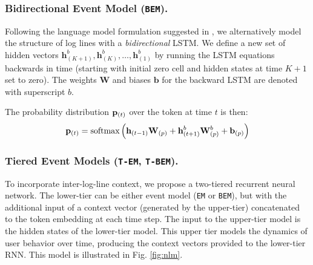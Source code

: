 \documentclass[letterpaper]{article} %
\begin{document}
\subsubsection{Bidirectional Event Model (\texttt{BEM}).}\label{subsec:bidirmodel}
Following the language model formulation suggested in \cite{schuster1997bidirectional}, we alternatively model the structure of log lines with a {\it bidirectional} LSTM.
 We define a new set of hidden vectors $\mathbf{h}^b_{(K+1)}, \mathbf{h}^b_{(K)},\dots,\mathbf{h}^b_{(1)}$ by running the LSTM equations backwards in time (starting with initial zero cell and hidden states at time $K+1$ set to zero).  The weights $\mathbf{W}$ and biases $\mathbf{b}$ for the backward LSTM are denoted with superscript $b$.

 The probability distribution ${\bf p}_{(t)} $ over the token at time $t$ is then:
\begin{equation}
    {\bf p}_{(t)}  = \mbox{softmax}\left({\bf h}_{(t-1)} {\bf W}_{(p)} + {\bf h}^b_{(t+1)} {\bf W}_{(p)}^{b}+ {\bf b}_{(p)}\right)
\end{equation}

\subsubsection{Tiered Event Models (\texttt{T-EM}, \texttt{T-BEM}).}\label{subsec:tieredmodel}
To incorporate inter-log-line context, we propose a two-tiered recurrent neural network.
The lower-tier can be either event model (\texttt{EM} or \texttt{BEM}), but with the additional input of a context vector (generated by the upper-tier) concatenated to the token embedding at each time step.
The input to the upper-tier model is the hidden states of the lower-tier model.  This upper tier models the dynamics of user behavior over time, producing the context vectors provided to the lower-tier RNN. This model is illustrated in Fig. \ref{fig:nlm}.
\end{document}
